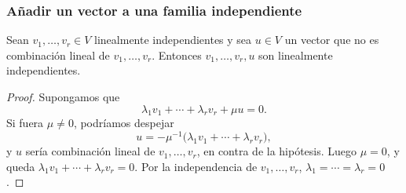 \begin{frame}
    \frametitle{Añadir un vector a una familia independiente}

    \begin{lemma}
        Sean \(v_1,\ldots,v_r\in V\) linealmente independientes y sea
        \(u\in V\) un vector que \alert{no} es combinación lineal de
        \(v_1,\ldots,v_r\). Entonces \(v_1,\ldots,v_r,u\) son linealmente
        independientes.
    \end{lemma}

    \begin{proof}
        Supongamos que
        \[
            \lambda_1v_1+\cdots+\lambda_rv_r+\mu u=0.
        \]
        Si fuera \(\mu\neq0\), podríamos despejar
        \[
            u=-\mu^{-1}\bigl(\lambda_1v_1+\cdots+\lambda_rv_r\bigr),
        \]
        y \(u\) sería combinación lineal de \(v_1,\ldots,v_r\), en contra
        de la hipótesis. Luego \(\mu=0\), y queda
        \(\lambda_1v_1+\cdots+\lambda_rv_r=0\). Por la independencia de
        \(v_1,\ldots,v_r\), \(\lambda_1=\cdots=\lambda_r=0\).
    \end{proof}
\end{frame}



